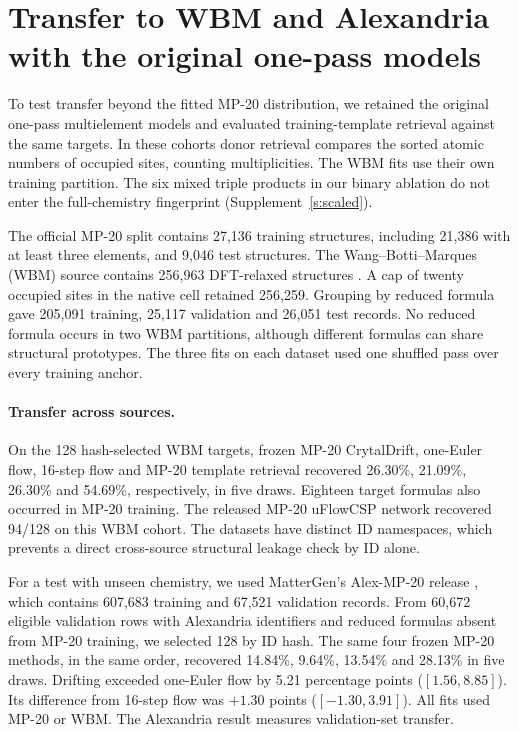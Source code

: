 \section{Transfer to WBM and Alexandria with the original one-pass models}
To test transfer beyond the fitted MP-20 distribution, we retained the original one-pass multielement models and evaluated training-template retrieval against the same targets. In these cohorts donor retrieval compares the sorted atomic numbers of occupied sites, counting multiplicities. The WBM fits use their own training partition. The six mixed triple products in our binary ablation do not enter the full-chemistry fingerprint (Supplement~\ref{s:scaled}).

The official MP-20 split contains 27,136 training structures, including 21,386 with at least three elements, and 9,046 test structures. The Wang--Botti--Marques (WBM) source contains 256,963 DFT-relaxed structures \cite{wbmdata}. A cap of twenty occupied sites in the native cell retained 256,259. Grouping by reduced formula gave 205,091 training, 25,117 validation and 26,051 test records. No reduced formula occurs in two WBM partitions, although different formulas can share structural prototypes. The three fits on each dataset used one shuffled pass over every training anchor.



\paragraph{Transfer across sources.}
On the 128 hash-selected WBM targets, frozen MP-20 CrytalDrift, one-Euler flow, 16-step flow and MP-20 template retrieval recovered 26.30\%, 21.09\%, 26.30\% and 54.69\%, respectively, in five draws. Eighteen target formulas also occurred in MP-20 training. The released MP-20 uFlowCSP network recovered 94/128 on this WBM cohort. The datasets have distinct ID namespaces, which prevents a direct cross-source structural leakage check by ID alone.

For a test with unseen chemistry, we used MatterGen's Alex-MP-20 release \cite{mattergen}, which contains 607,683 training and 67,521 validation records. From 60,672 eligible validation rows with Alexandria identifiers and reduced formulas absent from MP-20 training, we selected 128 by ID hash. The same four frozen MP-20 methods, in the same order, recovered 14.84\%, 9.64\%, 13.54\% and 28.13\% in five draws. Drifting exceeded one-Euler flow by 5.21 percentage points ($[1.56,8.85]$). Its difference from 16-step flow was $+1.30$ points ($[-1.30,3.91]$). All fits used MP-20 or WBM. The Alexandria result measures validation-set transfer.



